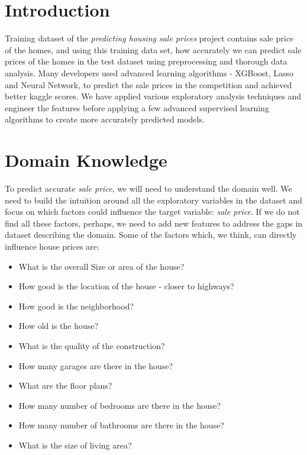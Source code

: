 \documentclass[sigconf]{acmart}
\begin{document}
	
	\section{Introduction} 
	
	Training dataset of the {\em predicting housing sale prices} project contains sale price of the homes, and using this training data set, how accurately we can predict sale prices  of the homes in the test dataset using preprocessing and thorough data analysis. Many developers used advanced learning algorithms - XGBoost, Lasso and Neural Network, to predict the sale prices in the competition and achieved better kaggle scores. We have applied various exploratory analysis techniques and engineer the features before applying a few advanced supervised learning algorithms to create more accurately predicted models. 
	
	\section{Domain Knowledge}
	 To predict accurate {\em sale price}, we will need to understand the domain well. We need to build the intuition around all the exploratory variables in the dataset and focus on which factors could influence the target variable: {\em sale price}. If we do not find all these factors, perhaps, we need to add new features to address the gaps in dataset describing the domain. Some of the factors which, we think, can directly influence house prices are:
	 
	 \begin{itemize}
	 	\item What is the overall Size or area of the house?
	 	\item How good is the location of the house - closer to highways?
	 	\item How good is the neighborhood?
	 	\item How old is the house?
	 	\item What is the quality of the construction?
	 	\item How many garages are there in the house?
	 	\item What are the floor plans?
	 	\item How many number of bedrooms are there in the house?
	 	\item How many number of bathrooms are there in the house?
	 	\item What is the size of living area?
	 \end{itemize}
			
\end{document}
